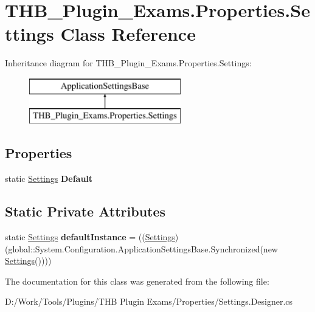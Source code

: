 \hypertarget{class_t_h_b___plugin___exams_1_1_properties_1_1_settings}{}\section{T\+H\+B\+\_\+\+Plugin\+\_\+\+Exams.\+Properties.\+Settings Class Reference}
\label{class_t_h_b___plugin___exams_1_1_properties_1_1_settings}
Inheritance diagram for T\+H\+B\+\_\+\+Plugin\+\_\+\+Exams.\+Properties.\+Settings\+:\begin{figure}[H]
\begin{center}
\leavevmode
\includegraphics[height=2.000000cm]{dc/d5b/class_t_h_b___plugin___exams_1_1_properties_1_1_settings}
\end{center}
\end{figure}
\subsection*{Properties}
\begin{DoxyCompactItemize}
\item 
\mbox{\label{class_t_h_b___plugin___exams_1_1_properties_1_1_settings_a66f1b0647e31c1a4ca44a07101154767}} 
static \mbox{\hyperlink{class_t_h_b___plugin___exams_1_1_properties_1_1_settings}{Settings}} {\bfseries Default}
\end{DoxyCompactItemize}
\subsection*{Static Private Attributes}
\begin{DoxyCompactItemize}
\item 
\mbox{\label{class_t_h_b___plugin___exams_1_1_properties_1_1_settings_a9aa1e91ef757890464a72793f1eb73f5}} 
static \mbox{\hyperlink{class_t_h_b___plugin___exams_1_1_properties_1_1_settings}{Settings}} {\bfseries default\+Instance} = ((\mbox{\hyperlink{class_t_h_b___plugin___exams_1_1_properties_1_1_settings}{Settings}})(global\+::\+System.\+Configuration.\+Application\+Settings\+Base.\+Synchronized(new \mbox{\hyperlink{class_t_h_b___plugin___exams_1_1_properties_1_1_settings}{Settings}}())))
\end{DoxyCompactItemize}


The documentation for this class was generated from the following file\+:\begin{DoxyCompactItemize}
\item 
D\+:/\+Work/\+Tools/\+Plugins/\+T\+H\+B Plugin Exams/\+Properties/Settings.\+Designer.\+cs\end{DoxyCompactItemize}
